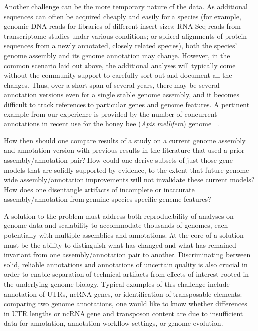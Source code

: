 Another challenge can be the more temporary nature of the data.
As additional sequences can often be acquired cheaply and easily for a species (for example, genomic DNA reads for libraries of different insert sizes; RNA-Seq reads from transcriptome studies under various conditions; or spliced alignments of protein sequences from a newly annotated, closely related species), both the species' genome assembly and its genome annotation may change.
However, in the common scenario laid out above, the additional analyses will typically come without the community support to carefully sort out and document all the changes.
Thus, over a short span of several years, there may be several annotation versions even for a single stable genome assembly, and it becomes difficult to track references to particular genes and genome features.
A pertinent example from our experience is provided by the number of concurrent annotations in recent use for the honey bee (\textit{Apis mellifera}) genome~ \cite{OGS1.0, OGS3.2, NCBIAm102}.

How then should one compare results of a study on a current genome assembly and annotation version with previous results in the literature that used a prior
assembly/annotation pair?
How could one derive subsets of just those gene models that are solidly supported by evidence, to the extent that future genome-wide assembly/annotation improvements will not invalidate these current models?
How does one disentangle artifacts of incomplete or inaccurate assembly/annotation from genuine species-specific genome features?

A solution to the problem must address both reproducibility of analyses on genome data and scalability to accommodate thousands of genomes, each potentially with multiple assemblies and annotations.
At the core of a solution must be the ability to distinguish what has changed and what has remained invariant from one assembly/annotation pair to another.
Discriminating between solid, reliable annotations and annotations of uncertain quality is also crucial in order to enable separation of technical artifacts from effects of interest rooted in the underlying genome biology.
Typical examples of this challenge include  annotation of UTRs, ncRNA genes, or identification of transposable elements: comparing two genome annotations, one would like to know whether differences in UTR lengths or ncRNA gene and transposon content are due to insufficient data for annotation, annotation workflow settings, or genome evolution.

